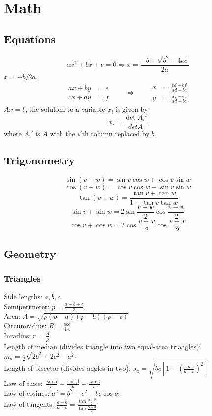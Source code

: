 \section{Math}
    \subsection{Equations}
        $$ax^2 + bx + c = 0 \Rightarrow x = \frac{-b \pm \sqrt{ b^2 -4ac }}{2a}$$
     $x = -b/2a$.
    \[
    \begin{aligned}
      ax + by &= e \\[2pt]
      cx + dy &= f
    \end{aligned}
    \qquad \Rightarrow \qquad
    \begin{aligned}
      x &= \frac{ed - bf}{ad - bc} \\[6pt]
      y &= \frac{af - ec}{ad - bc}
    \end{aligned}
    \]
     $Ax = b$, the solution to a variable $x_i$ is given by
    $$
    x_i = \frac{\det A_i'}{det A}
    $$
    where $A_i'$ is $A$ with the $i'$th column replaced by $b$.
    \subsection{Trigonometry}
        $$
        \sin(v + w) = \sin v \cos w + \cos v \sin w
        $$
        $$
        \cos(v + w) = \cos v \cos w - \sin v \sin w
        $$
        $$
        \tan(v + w) = \frac{ \tan v + \tan w}{ 1 - \tan v \tan w}
        $$
        $$
        \sin v + \sin w = 2 \sin \frac{v + w}{2}\cos \frac{v - w}{2}
        $$
        $$
        \cos v + \cos w = 2 \cos \frac{v + w}{2}\cos \frac{v - w}{2}
        $$
    \subsection{Geometry}
        \subsubsection{Triangles}
            Side lengths: $a, b, c$ \\
            Semiperimeter: $p = \frac{a + b + c}{2}$ \\
            Area: $A = \sqrt{p(p - a)(p - b)(p - c)}$ \\
            Circumradius: $R = \frac{abc}{4A}$ \\
            Inradius: $r = \frac{A}{p}$ \\
            Length of median (divides triangle into two equal-area triangles): $m_a = \frac{1}{2} \sqrt{2b^2 + 2c^2 - a^2}$. \\
            Length of bisector (divides angles in two): $s_a = \sqrt{bc[1 - (\frac{a}{b + c})^2]}$ \\
            Law of sines: $ \frac{\sin \alpha}{a} = \frac{\sin \beta}{b} =\frac{\sin \gamma}{c}$ \\
            Law of cosines: $a^2 = b^2 + c^2 - bc \cos \alpha$ \\
            Law of tangents: $\frac{a + b}{a - b} = \frac{\tan \frac{\alpha + \beta}{2}}{\tan \frac{\alpha - \beta}{2}}$

